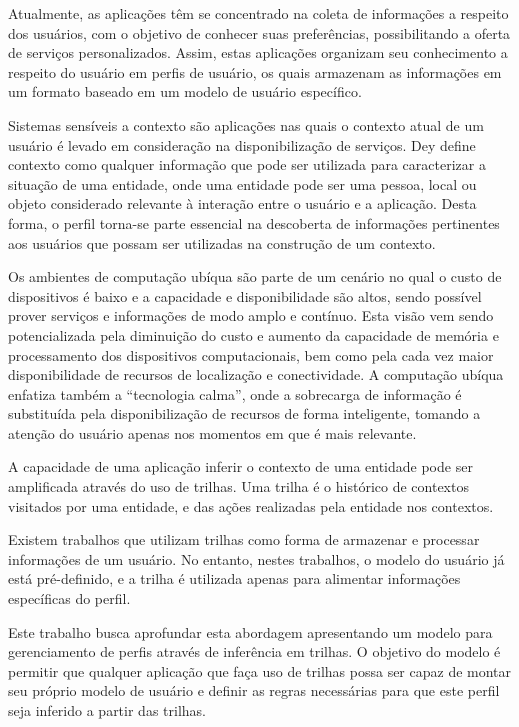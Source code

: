 Atualmente, as aplicações têm se concentrado na coleta de informações a respeito dos usuários, com o objetivo de conhecer suas preferências, possibilitando a oferta de serviços personalizados. Assim, estas aplicações organizam seu conhecimento a respeito do usuário em perfis de usuário, os quais armazenam as informações em um formato baseado em um modelo de usuário específico.\cite{viviani10}

Sistemas sensíveis a contexto são aplicações nas quais o contexto atual de um usuário é levado em consideração na disponibilização de serviços. Dey\cite{dey2001} define contexto como qualquer informação que pode ser utilizada para caracterizar a situação de uma entidade, onde uma entidade pode ser uma pessoa, local ou objeto considerado relevante à interação entre o usuário e a aplicação. Desta forma, o perfil torna-se parte essencial na descoberta de informações pertinentes aos usuários que possam ser utilizadas na construção de um contexto.

Os ambientes de computação ubíqua são parte de um cenário no qual o custo de dispositivos é baixo e a capacidade e disponibilidade são altos, sendo possível prover serviços e informações de modo amplo e contínuo\cite{weiser91}. Esta visão vem sendo potencializada pela diminuição do custo e aumento da capacidade de memória e processamento dos dispositivos computacionais, bem como pela cada vez maior disponibilidade de recursos de localização e conectividade. A computação ubíqua enfatiza também a ``tecnologia calma'', onde a sobrecarga de informação é substituída pela disponibilização de recursos de forma inteligente, tomando a atenção do usuário apenas nos momentos em que é mais relevante.\cite{weiser96}


A capacidade de uma aplicação inferir o contexto de uma entidade pode ser amplificada através do uso de trilhas\cite{silva09}. Uma trilha é o histórico de contextos visitados por uma entidade, e das ações realizadas pela entidade nos contextos.

Existem trabalhos que utilizam trilhas como forma de armazenar e processar informações de um usuário\cite{silva08,silva09}. No entanto, nestes trabalhos, o modelo do usuário já está pré-definido, e a trilha é utilizada apenas para alimentar informações específicas do perfil.

Este trabalho busca aprofundar esta abordagem apresentando um modelo para gerenciamento de perfis através de inferência em trilhas. O objetivo do modelo é permitir que qualquer aplicação que faça uso de trilhas possa ser capaz de montar seu próprio modelo de usuário e definir as regras necessárias para que este perfil seja inferido a partir das trilhas.

